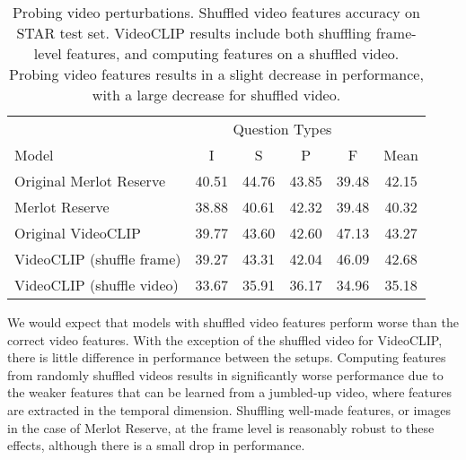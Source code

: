 \begin{table}[tp]
    \centering
	\caption{Probing video perturbations. Shuffled video features accuracy on
	STAR test set. VideoCLIP results include both shuffling frame-level features,
	and computing features on a shuffled video. Probing video features results
	in a slight decrease in performance, with a large decrease for shuffled video.}
    \label{tab:shuffle_feats}
    \begin{tabular}{lccccc}
        \toprule
        \multicolumn{1}{c}{}      & \multicolumn{4}{c}{Question Types}  & \multicolumn{1}{c}{} \\
        \cmidrule(){2-5}
        Model                     & I & S & P & F & Mean \\
        \cmidrule(r){1-1} \cmidrule(){2-5} \cmidrule(l){6-6}
        Original Merlot Reserve   & 40.51       & 44.76    & 43.85      & 39.48       & 42.15 \\  
		Merlot Reserve			  & 38.88		& 40.61	   & 42.32		& 39.48		  & 40.32 \\
        \cmidrule(r){1-1} \cmidrule(){2-5} \cmidrule(l){6-6}
        Original VideoCLIP        & 39.77       & 43.60    & 42.60      & 47.13       & 43.27 \\
		VideoCLIP (shuffle frame) & 39.27		& 43.31	   & 42.04		& 46.09		  & 42.68 \\
		VideoCLIP (shuffle video) & 33.67       & 35.91    & 36.17      & 34.96       & 35.18 \\
        \bottomrule
    \end{tabular}
\end{table}

We would expect that models with shuffled video features perform worse than the
correct video features. With the exception of the shuffled video for VideoCLIP,
there is little difference in performance between the setups. Computing
features from randomly shuffled videos results in significantly worse
performance due to the weaker features that can be learned from a jumbled-up
video, where features are extracted in the temporal dimension. Shuffling
well-made features, or images in the case of Merlot Reserve, at the frame level
is reasonably robust to these effects, although there is a small drop in
performance.

